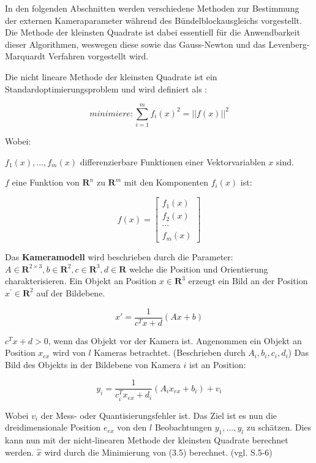 In den folgenden Abschnitten werden verschiedene Methoden zur Bestimmung der externen Kameraparameter während des Bündelblockausgleichs vorgestellt. Die Methode der kleinsten Quadrate ist dabei essentiell für die Anwendbarkeit dieser Algorithmen, weswegen diese sowie das Gauss-Newton und das Levenberg-Marquardt Verfahren vorgestellt wird. 

Die nicht lineare Methode der kleinsten Quadrate ist ein Standardoptimierungsproblem und wird definiert als \cite{nonlinear_1} :

\begin{equation}
minimiere: \sum_{i=1}^m f_i(x)^2 =  ||f(x)||^2
\end{equation} 

Wobei: 

$f_1(x),...,f_m(x)$ differenzierbare Funktionen einer Vektorvariablen $x$ sind.

$f$ eine Funktion von $\textbf{R}^n$ zu $\textbf{R}^m$ mit den Komponenten $f_i(x)$ ist:

\begin{equation}
f(x) = \begin{bmatrix}
f_1(x)\\ f_2(x)\\ \cdots \\ f_m(x)
\end{bmatrix}
\end{equation} 

Das \textbf{Kameramodell} wird beschrieben durch die Parameter: $A \in  \textbf{R}^{2\times 3}, b \in \textbf{R}^2, c \in  \textbf{R}^3, d \in \textbf{R}$ welche die Position und Orientierung charakterisieren. Ein Objekt an Position $x \in \textbf{R}^3 $ erzeugt ein Bild an der Position $x^\prime \in \textbf{R}^2$ auf der Bildebene.

\begin{equation}
x \prime = \frac{1}{c^Tx+d} (Ax +b )
\end{equation}

$c^Tx+d >0$, wenn das Objekt vor der Kamera ist. Angenommen ein Objekt an Position $x_{ex}$ wird von $l$ Kameras betrachtet. (Beschrieben durch $A_i,b_i,c_i,d_i$) Das Bild des Objekts in der Bildebene von Kamera $i$ ist an Position:

\begin{equation}
y_i = \frac{1}{c_i^T x_{ex}+d_i}(A_i x_{ex} + b_i) + v_i
\end{equation}

Wobei $v_i$ der Mess- oder Quantisierungsfehler ist. Das Ziel ist es nun die dreidimensionale Position $e_{ex}$ von den $l$ Beobachtungen $y_1,...,y_l$ zu schätzen. Dies kann nun mit der nicht-linearen Methode der kleinsten Quadrate berechnet werden. $\hat x$ wird durch die Minimierung von (3.5) berechnet. (vgl. \cite{nonlinear_1} S.5-6)

